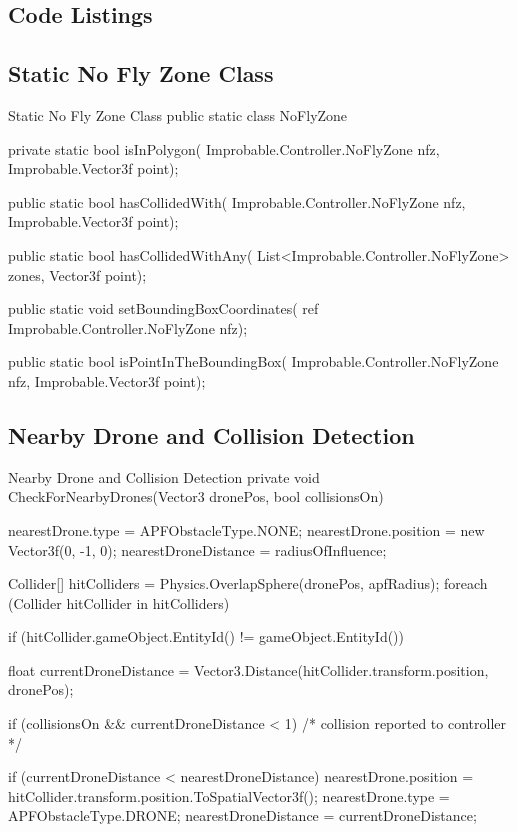 \documentclass[a4paper,11pt,titlepage]{report}
\begin{document}
\begin{appendices}
\chapter{Code Listings}
\section{Static No Fly Zone Class}
\begin{sexylisting}[colback=white]{Static No Fly Zone Class}
public static class NoFlyZone
{
    private static bool isInPolygon(
      Improbable.Controller.NoFlyZone nfz,
      Improbable.Vector3f point);

    public static bool hasCollidedWith(
      Improbable.Controller.NoFlyZone nfz,
      Improbable.Vector3f point);

    public static bool hasCollidedWithAny(
      List<Improbable.Controller.NoFlyZone> zones,
      Vector3f point);

    public static void setBoundingBoxCoordinates(
      ref Improbable.Controller.NoFlyZone nfz);

    public static bool isPointInTheBoundingBox(
      Improbable.Controller.NoFlyZone nfz,
      Improbable.Vector3f point);
}
\end{sexylisting}

\section{Nearby Drone and Collision Detection}
\begin{sexylisting}[colback=white]{Nearby Drone and Collision Detection}
private void CheckForNearbyDrones(Vector3 dronePos, bool collisionsOn)
{
  nearestDrone.type = APFObstacleType.NONE;
  nearestDrone.position = new Vector3f(0, -1, 0);
  nearestDroneDistance = radiusOfInfluence;

  Collider[] hitColliders = Physics.OverlapSphere(dronePos, apfRadius);
  foreach (Collider hitCollider in hitColliders)
  {
    if (hitCollider.gameObject.EntityId() != gameObject.EntityId())
    {
      float currentDroneDistance
        = Vector3.Distance(hitCollider.transform.position, dronePos);

      if (collisionsOn && currentDroneDistance < 1)
      {
        /* collision reported to controller */
      }

      if (currentDroneDistance < nearestDroneDistance)
      {
        nearestDrone.position
          = hitCollider.transform.position.ToSpatialVector3f();
        nearestDrone.type = APFObstacleType.DRONE;
        nearestDroneDistance = currentDroneDistance;
      }
    }
  }
}
\end{sexylisting}


\end{appendices}
\end{document}

